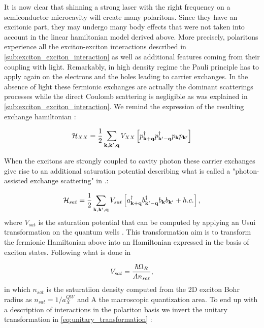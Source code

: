 It is now clear that shinning a strong laser with the right frequency on a semiconductor microcavity will create many polaritons. Since they have an excitonic part,
they may undergo many body effects that were not taken into account in the linear hamiltonian model derived above. More precisely, polaritons experience 
all the exciton-exciton interactions described in \autoref{sub:exciton_exciton_interaction} as well as additional features coming from their coupling with light.
Remarkably, in high density regime the Pauli principle has to apply again on the electrons and the holes leading to carrier exchanges. In the absence of light
these fermionic exchanges are actually the dominant scatterings processes while the direct Coulomb scattering is negligible as was explained in \autoref{sub:exciton_exciton_interaction}.
We remind the expression of the resulting exchange hamiltonian :

\begin{equation}
    \mathcal{H}_{XX} = \dfrac{1}{2}\sum_{\mathbf{k}, \mathbf{k}', \mathbf{q}}V_{XX}\left[p^{\dagger}_{\mathbf{k+q}}p^{\dagger}_{\mathbf{k'-q}}p_{\mathbf{k}}p_{\mathbf{k'}}\right]
    \label{eq:direct_pol_interaction}
\end{equation}

When the excitons are strongly coupled to cavity photon these carrier exchanges give rise to an additional saturation potential describing what is called a "photon-assisted exchange scattering" in \cite{Combescot_2007_exact_pol_pol_interactions}.:


\begin{equation}
    \mathcal{H}_{sat} = \dfrac{1}{2} \sum_{\mathbf{k}, \mathbf{k}', \mathbf{q}} V_{sat} \left[ a^\dagger_{\mathbf{k}+ \mathbf{q}} b^\dagger_{\mathbf{k}'- \mathbf{q}} b_{\mathbf{k}} b_{\mathbf{k}'} + h.c. \right],
\end{equation}
where $V_{sat}$ is the saturation potential that can be computed by applying an Usui transformation on the quantum wells \cite{usui_sat_potential_1960}. This transformation aim
is to transform the fermionic Hamiltonian above into an Hamiltonian expressed in the basis of exciton states. Following what is done in \cite{usui_2000}

\begin{equation}
    V_{sat}=\dfrac{\hbar\Omega_R}{An_{sat}},
\end{equation}
in which $n_{sat}$ is the saturatiion density computed from the 2D exciton Bohr radius as $n_{sat}=1/a_X^{QW}$ and A the macroscopic quantization area.
To end up with a description of interactions in the polariton basis we invert the unitary transformation in \autoref{eq:unitary_transformation} : 

